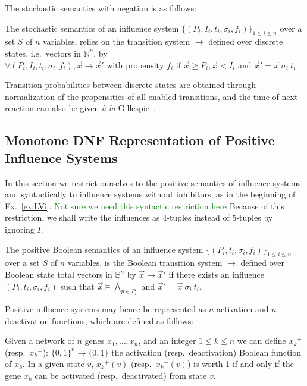 \documentclass{llncs}
\newcommand{\sylvain}[1]{\textcolor{green}{#1}}
\newcommand{\lra}{\longrightarrow}
\begin{document}
The stochastic semantics with negation is as follows:

\begin{definition}\label{def:stoch}
   The stochastic semantics of an influence system $\{(P_i, I_i, t_i,
   \sigma_i, f_i)\}_{1\leq i\leq n}$ over a set $S$ of $n$ variables, relies
   on the transition system $\lra$ defined over discrete states, i.e.\
   vectors in $\mathbb{N}^n$, by $\forall (P_i, I_i, t_i, \sigma_i, f_i), {\vec
   x}\lra{\vec x'} \text{ with propensity }f_i\text{ if }{\vec x}\geq P_i,
   {\vec x}<I_i$ and ${\vec x'} = {\vec x}\  \sigma_i\ t_i$

   Transition probabilities between discrete states are obtained through
   normalization of the propensities of all enabled transitions, and the time
   of next reaction can also be given \emph{\`a la}
   Gillespie~\cite{Gillespie77jpc}.

\end{definition}

\subsection{Monotone DNF Representation of Positive Influence Systems}


In this section we restrict ourselves to the positive semantics of influence systems
and syntactically to influence systems without inhibitors, as in the beginning
of Ex.~\ref{ex:LVi}.
\sylvain{Not sure we need this syntactic restriction here}
Because of this restriction, we shall write the influences as 4-tuples instead
of 5-tuples by ignoring $I$.

\begin{definition}
	The positive Boolean semantics of an influence system $\{(P_i, t_i,
   \sigma_i, f_i)\}_{1\leq i\leq n}$
	over a set $S$ of $n$ variables,
	is the Boolean transition system $\lra$ defined over Boolean state total vectors in $\mathbb{B}^n$
	by
	${\vec x}\lra{\vec x'}$ if there exists an influence $(P_i, t_i, \sigma_i, f_i)$
	such that ${\vec x}\models \bigwedge_{p\in P_i}$
	and ${\vec x'} = {\vec x}\ \sigma_i\ t_i$.
\end{definition}

Positive influence systems may hence be represented as $n$ activation and $n$ deactivation functions, which are defined as follows:


\begin{definition}\label{def:activation}
	Given a network of $n$ genes $x_1,\ldots,x_n$, and
	an integer $1 \leq k \leq n$ we can define ${x_k}^+$ (resp.\ ${x_k}^-$):
	${\{0,1\}}^n \rightarrow\{0,1\}$ the activation (resp.\ deactivation)
	Boolean function of $x_k$. In a given state $v$, ${x_k}^+(v)$ (resp.\
   ${x_k}^-(v)$) is worth 1 if and only if the gene $x_k$ can be activated
   (resp.\ deactivated) from state $v$.
\end{definition}
\end{document}
